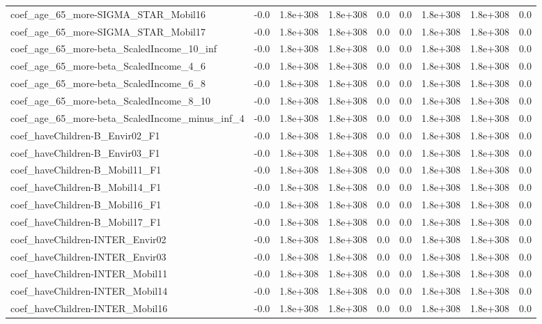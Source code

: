 \begin{tabular}{lrrrrrrrr}
coef_age_65_more-SIGMA_STAR_Mobil16 & -0.0 & 1.8e+308 & 1.8e+308 & 0.0 & 0.0 & 1.8e+308 & 1.8e+308 & 0.0 \\
coef_age_65_more-SIGMA_STAR_Mobil17 & -0.0 & 1.8e+308 & 1.8e+308 & 0.0 & 0.0 & 1.8e+308 & 1.8e+308 & 0.0 \\
coef_age_65_more-beta_ScaledIncome_10_inf & -0.0 & 1.8e+308 & 1.8e+308 & 0.0 & 0.0 & 1.8e+308 & 1.8e+308 & 0.0 \\
coef_age_65_more-beta_ScaledIncome_4_6 & -0.0 & 1.8e+308 & 1.8e+308 & 0.0 & 0.0 & 1.8e+308 & 1.8e+308 & 0.0 \\
coef_age_65_more-beta_ScaledIncome_6_8 & -0.0 & 1.8e+308 & 1.8e+308 & 0.0 & 0.0 & 1.8e+308 & 1.8e+308 & 0.0 \\
coef_age_65_more-beta_ScaledIncome_8_10 & -0.0 & 1.8e+308 & 1.8e+308 & 0.0 & 0.0 & 1.8e+308 & 1.8e+308 & 0.0 \\
coef_age_65_more-beta_ScaledIncome_minus_inf_4 & -0.0 & 1.8e+308 & 1.8e+308 & 0.0 & 0.0 & 1.8e+308 & 1.8e+308 & 0.0 \\
coef_haveChildren-B_Envir02_F1 & -0.0 & 1.8e+308 & 1.8e+308 & 0.0 & 0.0 & 1.8e+308 & 1.8e+308 & 0.0 \\
coef_haveChildren-B_Envir03_F1 & -0.0 & 1.8e+308 & 1.8e+308 & 0.0 & 0.0 & 1.8e+308 & 1.8e+308 & 0.0 \\
coef_haveChildren-B_Mobil11_F1 & -0.0 & 1.8e+308 & 1.8e+308 & 0.0 & 0.0 & 1.8e+308 & 1.8e+308 & 0.0 \\
coef_haveChildren-B_Mobil14_F1 & -0.0 & 1.8e+308 & 1.8e+308 & 0.0 & 0.0 & 1.8e+308 & 1.8e+308 & 0.0 \\
coef_haveChildren-B_Mobil16_F1 & -0.0 & 1.8e+308 & 1.8e+308 & 0.0 & 0.0 & 1.8e+308 & 1.8e+308 & 0.0 \\
coef_haveChildren-B_Mobil17_F1 & -0.0 & 1.8e+308 & 1.8e+308 & 0.0 & 0.0 & 1.8e+308 & 1.8e+308 & 0.0 \\
coef_haveChildren-INTER_Envir02 & -0.0 & 1.8e+308 & 1.8e+308 & 0.0 & 0.0 & 1.8e+308 & 1.8e+308 & 0.0 \\
coef_haveChildren-INTER_Envir03 & -0.0 & 1.8e+308 & 1.8e+308 & 0.0 & 0.0 & 1.8e+308 & 1.8e+308 & 0.0 \\
coef_haveChildren-INTER_Mobil11 & -0.0 & 1.8e+308 & 1.8e+308 & 0.0 & 0.0 & 1.8e+308 & 1.8e+308 & 0.0 \\
coef_haveChildren-INTER_Mobil14 & -0.0 & 1.8e+308 & 1.8e+308 & 0.0 & 0.0 & 1.8e+308 & 1.8e+308 & 0.0 \\
coef_haveChildren-INTER_Mobil16 & -0.0 & 1.8e+308 & 1.8e+308 & 0.0 & 0.0 & 1.8e+308 & 1.8e+308 & 0.0 \\

\end{tabular}
